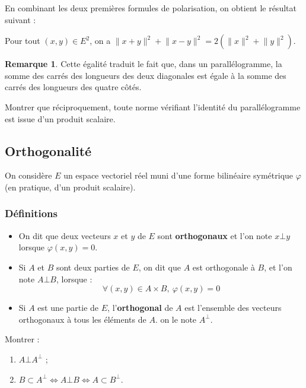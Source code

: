 \documentclass[french]{article}
\theoremstyle{plain}
\theoremstyle{definition}
\newtheorem*{rmq}{Remarque}
\theoremstyle{remark}
\begin{document}
En combinant les deux premières formules de polarisation, on obtient le résultat suivant : 

\begin{prop}
	Pour tout $(x,y)\in E^2$, on a $\lVert x+y\rVert^2+\lVert x-y\rVert^2=2(\lVert x\rVert^2+\lVert y\rVert^2)$.
\end{prop}

\begin{rmq}
	Cette égalité traduit le fait que, dans un parallélogramme, la somme des carrés des longueurs des deux diagonales est égale à la somme des carrés des longueurs des quatre côtés.
\end{rmq}

\begin{exo}[$\star$]
	Montrer que réciproquement, toute norme vérifiant l'identité du parallélogramme est issue d'un produit scalaire.
\end{exo}

\subsection{Orthogonalité}
On considère $E$ un espace vectoriel réel muni d'une forme bilinéaire symétrique $\varphi$ (en pratique, d'un produit scalaire).
\subsubsection*{Définitions}

\begin{dfn}
	\begin{itemize}
		\item On dit que deux vecteurs $x$ et $y$ de $E$ sont \textbf{orthogonaux} et l'on note $x\bot y$ lorsque $\varphi(x,y)=0$.
		\item Si $A$ et $B$ sont deux parties de $E$, on dit que $A$ est orthogonale à $B$, et l'on note $A\bot B$, lorsque : $$\forall (x,y)\in A\times B,\ \varphi(x,y)=0$$
		\item Si $A$ est une partie de $E$, l'\textbf{orthogonal} de $A$ est l'ensemble des vecteurs orthogonaux à tous les éléments de $A$. on le note $A^\bot$.
	\end{itemize}
\end{dfn}

\begin{exo}
	Montrer : 
	\begin{enumerate}
		\item $A\bot A^\bot$ ;
		\item $B\subset A^\bot \iff A\bot B\iff A\subset B^\bot$.
	\end{enumerate}
\end{exo}
\end{document}
